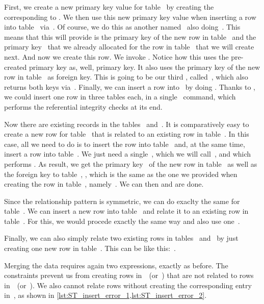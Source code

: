 First, we create a new primary key value for table~ by creating the ~ corresponding to .
We then use this new primary key value when inserting a row into table~ via~.
Of course, we do this as another  named~ also doing~.
This means that this  will provide is the primary key of the new row in table~ and the primary key~ that we already allocated for the row in table~ that we will create next.
And now we create this row.
We invoke .
Notice how this uses the pre-created primary key as, well, primary key.
It also uses the primary key of the new row in table~ as foreign key.
This is going to be our third , called~, which also returns both keys via~.
Finally, we can insert a row into~ by doing .
Thanks to , we could insert one row in three tables each, in a single \sql\ command, which performs the referential integrity checks at its end.%
%
\begin{sloppypar}%
Now there are existing records in the tables~ and~.
It is comparatively easy to create a new row for table~ that is related to an existing row in table~.
In this case, all we need to do is to insert the row into table~ and, at the same time, insert a row into table~.
We just need a single~, which we will call~, and which performs .
As result, we get the primary key~ of the new row in table~ as well as the foreign key to table~, , which is the same as the one we provided when creating the row in table~, namely~.
We can then  and are done.%
\end{sloppypar}%
%
Since the relationship pattern is symmetric, we can do exaclty the same for table~.
We can insert a new row into table~ and relate it to an existing row in table~.
For this, we would procede exactly the same way and also use one~.

Finally, we can also simply relate two existing rows in tables~ and~ by just creating one new row in table~.
This can be like this:~.

Merging the data requires again two  expressions, exactly as before.
The constraints prevent us from creating rows in~~(or~) that are not related to rows in~~(or~).
We also cannot relate rows without creating the corresponding entry in~, as shown in \cref{lst:ST_insert_error_1,lst:ST_insert_error_2}.%
%
\FloatBarrier%
\endhsection%
%
